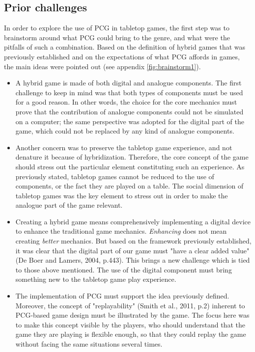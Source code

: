\subsection{Prior challenges}
In order to explore the use of PCG in tabletop games, the first step was to brainstorm around what PCG could bring to the genre, and what were the pitfalls of such a combination. Based on the definition of hybrid games that was previously established and on the expectations of what PCG affords in games, the main ideas were pointed out (see appendix \ref{fig:brainstorm1}).
\begin{itemize}
\item A hybrid game is made of both digital and analogue components. The first challenge to keep in mind was that both types of components must be used for a good reason. In other words, the choice for the core mechanics must prove that the contribution of analogue components could not be simulated on a computer; the same perspective was adopted for the digital part of the game, which could not be replaced by any kind of analogue components.  
\item Another concern was to preserve the tabletop game experience, and not denature it because of hybridization. Therefore, the core concept of the game should stress out the particular element constituting such an experience. As previously stated, tabletop games cannot be reduced to the use of components, or the fact they are played on a table. The social dimension of tabletop games was the key element to stress out in order to make the analogue part of the game relevant.
\item Creating a hybrid game means comprehensively implementing a digital device to enhance the traditional game mechanics. \textit{Enhancing} does not mean creating \textit{better} mechanics. But based on the framework previously established, it was clear that the digital part of our game must "have a clear added value" (De Boer and Lamers, 2004, p.443)\cite{chap:aug}. This brings a new challenge which is tied to those above mentioned. The use of the digital component must bring something new to the tabletop game play experience.
\item The implementation of PCG must support the idea previously defined. Moreover, the concept of "replayability" (Smith et al., 2011, p.2)\cite{pdf:pcgbased} inherent to PCG-based game design must be illustrated by the game. The focus here was to make this concept visible by the players, who should understand that the game they are playing is flexible enough, so that they could replay the game without facing the same situations several times.

\end{itemize}
